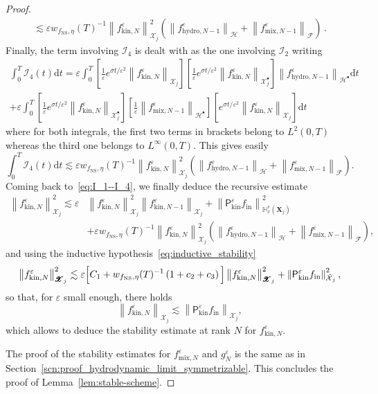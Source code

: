 \documentclass[AHL,Unicode,longabstracts,published]{cedram}
\newcommand{\ini}{\mathrm{in}}
\newcommand{\ns}{\mathrm{NS}}
\newcommand{\hyd}{\mathrm{hydro}}
\newcommand{\mix}{\mathrm{mix}}
\newcommand{\kin}{\mathrm{kin}}
\renewcommand{\d}{\mathrm{d}}
\newcommand{\bbH}{\mathbb{H}}
\newcommand{\XX}{\mathcal{X}}
\newcommand{\HH}{\mathcal{H}}
\newcommand{\PP}{\mathsf{P}}
\newcommand{\FFF}{\mathscr{F}}
\newcommand{\HHH}{\mathscr{H}}
\newcommand{\GGG}{\mathscr{X}}
\newcommand{\scI}{\mathscr{I}}
\newcommand{\SSsp}{\HH^{\bullet}}
\newcommand{\SSSs}{\HHH}
\newcommand{\SSl}{\XX}
\newcommand{\Sh}{\bm{X}}
\newcommand{\SSh}{\bm{\XX}}
\newcommand{\SShp}{\bm{\XX}^{\bullet}}
\newcommand{\SSSh}{\pmb{\GGG}}
\newcommand{\SSSm}{\FFF}
\newcommand*\eps{{\varepsilon}}
\let\oldtilde\tilde
\renewcommand*{\tilde}[1]{\mathchoice{\widetilde{#1}}{\widetilde{#1}}{\oldtilde{#1}}{\oldtilde{#1}}}
\begin{document}
\begin{proof}
\begin{multline*}
\lesssim \eps w_{ f_\ns, \eta }(T)^{-1} \left\| f^\eps_{\kin, N} \right\|^2_{\SSSh_j} \left(\left\| f^\eps_{\hyd, N-1}\right\|_{\SSSs} + \left\| f^\eps_{\mix, N-1}\right\|_{\SSSm} \right)\,.
\end{multline*}
Finally, the term involving $\scI_4$ is dealt with as the one involving $\scI_2$ writing
\begin{multline*}
\int_0^T \scI_4(t)\d t = \eps \int_0^T \left[\frac{1}{\eps} e^{\sigma t / \eps^2} \left\| f^\eps_{\kin, N} \right\|_{\SSh_j} \right] \left[\frac{1}{\eps} e^{\sigma t / \eps^2} \left\| f^\eps_{\kin, N} \right\|_{\SShp_{j}} \right] \left\| f^\eps_{\hyd, N-1} \right\|_{\SSsp} \d t \\
+ \eps \int_0^T \left[\frac{1}{\eps} e^{\sigma t / \eps^2} \left\| f^\eps_{\kin, N} \right\|_{\SShp_{j}} \right] \left[\frac{1}{\eps} \left\| f^\eps_{\mix, N-1} \right\|_{\SSsp} \right] \left[e^{\sigma t / \eps^2} \left\| f^\eps_{\kin, N}\right\|_{\SSh_j} \right]\d t
\end{multline*}
where for both integrals, the first two terms in brackets belong to $L^2(0,T)$ whereas the third one belongs to $L^\infty(0,T)$. This gives easily
\[
\int_0^T \scI_4(t)\d t \lesssim \eps w_{ f_\ns, \eta }(T)^{-1} \left\| f^\eps_{\kin, N} \right\|^2_{\SSSh_j} \left(\left\| f^\eps_{\hyd, N-1} \right\|_{\SSSs} + \left\| f^\eps_{\mix, N-1}\right\|_{\SSSm} \right).
\]
Coming back to~\eqref{eq:I_1--I_4}, we finally deduce the recursive estimate
\begin{align*}
\left\| f^\eps_{\kin, N} \right\|^2_{\SSSh_j} \lesssim \eps & \left\| f^\eps_{\kin, N} \right\|^2_{ \SSSh_j} \left\| f^\eps_{\kin, N-1} \right\|_{ \SSSh_j} + \left\| \PP^\eps_\kin f_\ini \right\|^2_{\bbH^s_x(\Sh_j)}\\
&+ \eps w_{ f_\ns, \eta }(T)^{-1} \left\| f^\eps_{\kin, N} \right\|^2_{\SSSh_j} \left(\left\| f^\eps_{\hyd, N-1} \right\|_{\SSSs} + \left\| f^\eps_{\mix, N-1} \right\|_{\SSSm} \right),
\end{align*}
and using the inductive hypothesis~\eqref{eq:inductive_stability}
\begin{equation*}
\left\| f^\eps_{\kin, N} \right\|^2_{\SSSh_j} \lesssim \eps \Big[C_1 + w_{ f_\ns, \eta }(T)^{-1} \left(1 + c_2 + c_3 \right) \Big]\left\| f^\eps_{\kin, N} \right\|^2_{ \SSSh_j} + \left\| \PP^\eps_\kin f_\ini \right\|^2_{\tilde{\SSl}_j},
\end{equation*}
so that, for $\eps$ small enough, there holds
\[
\left\| f^\eps_{\kin, N} \right\|_{\SSSh_j} \lesssim \left\| \PP^\eps_\kin f_\ini \right\|_{\SSSh_j},
\]
which allows to deduce the stability estimate at rank $N$ for $f^\eps_{\kin, N}$.

The proof of the stability estimates for $f^\eps_{\mix, N}$ and $g^\eps_N$ is the same as in Section~\ref{scn:proof_hydrodynamic_limit_symmetrizable}. This concludes the proof of Lemma~\ref{lem:stable-scheme}.
\end{proof}
\end{document}
